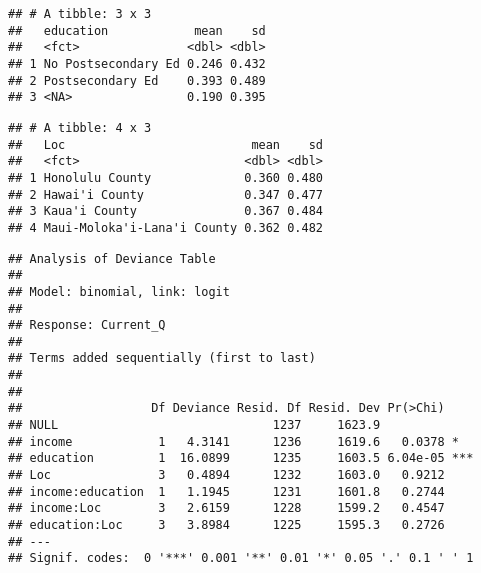 \documentclass[]{article}
\begin{document}
\begin{verbatim}
## # A tibble: 3 x 3
##   education            mean    sd
##   <fct>               <dbl> <dbl>
## 1 No Postsecondary Ed 0.246 0.432
## 2 Postsecondary Ed    0.393 0.489
## 3 <NA>                0.190 0.395
\end{verbatim}

\begin{verbatim}
## # A tibble: 4 x 3
##   Loc                          mean    sd
##   <fct>                       <dbl> <dbl>
## 1 Honolulu County             0.360 0.480
## 2 Hawai'i County              0.347 0.477
## 3 Kaua'i County               0.367 0.484
## 4 Maui-Moloka'i-Lana'i County 0.362 0.482
\end{verbatim}

\begin{verbatim}
## Analysis of Deviance Table
## 
## Model: binomial, link: logit
## 
## Response: Current_Q
## 
## Terms added sequentially (first to last)
## 
## 
##                  Df Deviance Resid. Df Resid. Dev Pr(>Chi)    
## NULL                              1237     1623.9             
## income            1   4.3141      1236     1619.6   0.0378 *  
## education         1  16.0899      1235     1603.5 6.04e-05 ***
## Loc               3   0.4894      1232     1603.0   0.9212    
## income:education  1   1.1945      1231     1601.8   0.2744    
## income:Loc        3   2.6159      1228     1599.2   0.4547    
## education:Loc     3   3.8984      1225     1595.3   0.2726    
## ---
## Signif. codes:  0 '***' 0.001 '**' 0.01 '*' 0.05 '.' 0.1 ' ' 1
\end{verbatim}
\end{document}
